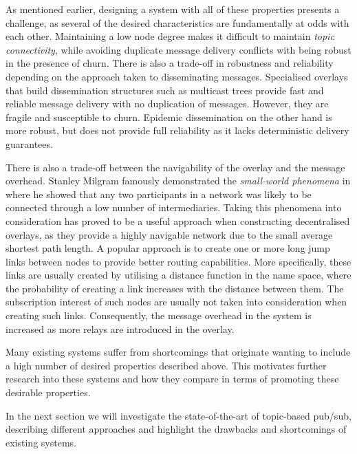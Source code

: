 As mentioned earlier, designing a system with all of these properties
presents a challenge, as several of the desired characteristics are
fundamentally at odds with each other. Maintaining a low node degree
makes it difficult to maintain \emph{topic connectivity}, while
avoiding duplicate message delivery conflicts with being robust in the
presence of churn. There is also a trade-off in robustness and
reliability depending on the approach taken to disseminating messages.
Specialised overlays that build dissemination structures such as
multicast trees provide fast and reliable message delivery with no
duplication of messages. However, they are fragile and susceptible to
churn. Epidemic dissemination on the other hand is more robust, but does
not provide full reliability as it lacks deterministic delivery
guarantees. 

There is also a trade-off between the navigability of the overlay and
the message overhead. Stanley Milgram famously demonstrated the
\emph{small-world phenomena} in \cite{milgram1967small} where he showed
that any two participants in a network was likely to be connected
through a low number of intermediaries. Taking this phenomena into
consideration has proved to be a useful approach when constructing
decentralised overlays, as they provide a highly navigable network due
to the small average shortest path length. A popular approach is to
create one or more long jump links between nodes to provide better
routing capabilities. More specifically, these links are usually created
by utilising a distance function in the name space, where the
probability of creating a link increases with the distance between them.
The subscription interest of such nodes are usually not taken into
consideration when creating such links. Consequently, the message
overhead in the system is increased as more relays are introduced in the
overlay.

Many existing systems suffer from shortcomings that originate wanting
to include a high number of desired properties described above. This
motivates further research into these systems and how they compare in
terms of promoting these desirable properties.

In the next section we will investigate the state-of-the-art of topic-based
pub/sub, describing different approaches and highlight the drawbacks and
shortcomings of existing systems.

